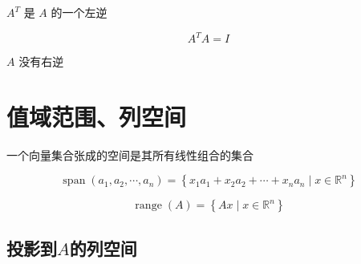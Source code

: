 \begin{theorem}
    $ A^{T} $ 是 $ A $ 的一个左逆

    $$A^T A =I$$
\end{theorem}

\begin{theorem}
    $ A $ 没有右逆
\end{theorem}

\section{值域范围、列空间}

\begin{definition}[向量集合张成的空间]
    一个向量集合张成的空间是其所有线性组合的集合

    $$ \operatorname{span}\left(a_{1}, a_{2}, \cdots, a_{n}\right)=\left\{x_{1} a_{1}+x_{2} a_{2}+\cdots+x_{n} a_{n} \mid x \in \mathbb{R}^{n}\right\} $$
\end{definition}

\begin{definition}
    $$ \operatorname{range}(A)=\left\{A x \mid x \in \mathbb{R}^{n}\right\} $$
\end{definition}

\subsection{投影到$A$的列空间}


